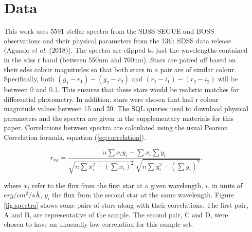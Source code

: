 \documentclass[a4paper,fleqn,usenatbib]{mnras}
\begin{document}
\hypertarget{data}{%
\section{Data}\label{data}}

This work uses 5591 stellar spectra from the SDSS SEGUE and BOSS
observations and their physical parameters from the 13th SDSS data
release (Aguado \emph{et al.} (2018)). The spectra are clipped to just
the wavelengths contained in the sdss r band (between 550nm and 700nm).
Stars are paired off based on their sdss colour magnitudes so that both
stars in a pair are of similar colour. Specifically, both
\((g_1-r_1)-(g_2-r_2)\) and \((r_1-i_1)-(r_2-i_2)\) will be between 0
and 0.1. This ensures that these stars would be realistic matches for
differential photometry. In addition, stars were chosen that had r
colour magnitude values between 15 and 20. The SQL queries used to
download physical parameters and the spectra are given in the
supplementary materials for this paper. Correlations between spectra are
calculated using the usual Pearson Correlation formula, equation
(\ref{eq:correlation}).

\begin{equation}
  \displaystyle r_{xy}={\frac {n\sum x_{i}y_{i}-\sum x_{i}\sum y_{i}}{{\sqrt {n\sum x_{i}^{2}-\left(\sum x_{i}\right)^{2}}}~{\sqrt {n\sum y_{i}^{2}-\left(\sum y_{i}\right)^{2}}}}}.
  \label{eq:correlation}
\end{equation}

where \(x_i\) refer to the flux from the first star at a given
wavelength, \(i\), in units of \(erg/cm^2/s Å\), \(y_i\) the flux from
the second star at the same wavelength. Figure \ref{fig:spectra} shows
some pairs of stars along with their correlations. The first pair, A and
B, are representative of the sample. The second pair, C and D, were
chosen to have an unusually low correlation for this sample set.
\end{document}
